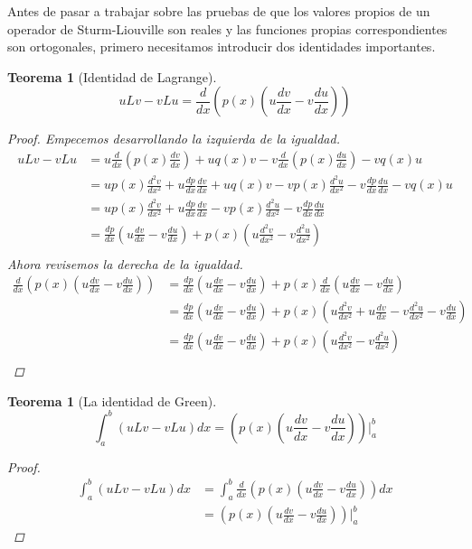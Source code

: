 \documentclass[11pt]{book}
\theoremstyle{plain}
\newtheorem{teo}[proposición]{Teorema}
\theoremstyle{definition}
\begin{document}
    Antes de pasar a trabajar sobre las pruebas de que los valores propios de un operador de Sturm-Liouville son reales y las funciones propias correspondientes son ortogonales, primero necesitamos introducir dos identidades importantes.
    \begin{teo}[Identidad de Lagrange]
        \[
            uLv - vLu = \frac{d}{dx}\left(p(x)\left(u\frac{dv}{dx} - v\frac{du}{dx}\right)\right)
        \]
        \begin{proof}
            Empecemos desarrollando la izquierda de la igualdad.
            \begin{align*}
                uLv - vLu &= u\frac{d}{dx}\left(p(x)\frac{dv}{dx}\right) + uq(x)v - v\frac{d}{dx}\left(p(x)\frac{du}{dx}\right) - vq(x)u\\
                &= u p(x)\frac{d^{2}v}{dx^{2}} + u\frac{dp}{dx}\frac{dv}{dx} + uq(x)v - v p(x)\frac{d^{2}u}{dx^{2}} - v\frac{dp}{dx}\frac{du}{dx} - vq(x)u\\
                &= u p(x)\frac{d^{2}v}{dx^{2}} + u\frac{dp}{dx}\frac{dv}{dx} - v p(x)\frac{d^{2}u}{dx^{2}} - v\frac{dp}{dx}\frac{du}{dx}\\
                &= \frac{dp}{dx}\left(u\frac{dv}{dx} - v\frac{du}{dx}\right) + p(x)\left(u\frac{d^{2}v}{dx^{2}} - v\frac{d^{2}u}{dx^{2}}\right)\\
            \end{align*}
            Ahora revisemos la derecha de la igualdad.
            \begin{align*}
                \frac{d}{dx}\left(p(x)\left(u\frac{dv}{dx} - v\frac{du}{dx}\right)\right) &= \frac{dp}{dx}\left(u\frac{dv}{dx} - v\frac{du}{dx}\right) + p(x)\frac{d}{dx}\left(u\frac{dv}{dx} - v\frac{du}{dx}\right)\\
                &= \frac{dp}{dx}\left(u\frac{dv}{dx} - v\frac{du}{dx}\right) + p(x)\left(u\frac{d^{2}v}{dx^{2}} + u\frac{dv}{dx} - v\frac{d^{2}u}{dx^{2}} - v\frac{du}{dx}\right)\\
                &= \frac{dp}{dx}\left(u\frac{dv}{dx} - v\frac{du}{dx}\right) + p(x)\left(u\frac{d^{2}v}{dx^{2}} - v\frac{d^{2}u}{dx^{2}}\right)\\ 
            \end{align*}
        \end{proof}
    \end{teo}
    \begin{teo}[La identidad de Green]
        \[
            \int_{a}^{b} \left(uLv - vLu\right)dx = \left(p(x)\left(u\frac{dv}{dx} - v\frac{du}{dx}\right)\right)|_{a}^{b}
        \]
        \begin{proof}
            \begin{align*}
                \int_{a}^{b} \left(uLv - vLu\right)dx &= \int_{a}^{b} \frac{d}{dx}\left(p(x)\left(u\frac{dv}{dx} - v\frac{du}{dx}\right)\right)dx\\
                &= \left(p(x)\left(u\frac{dv}{dx} - v\frac{du}{dx}\right)\right)|_{a}^{b}
            \end{align*}
        \end{proof}
    \end{teo}
\end{document}
